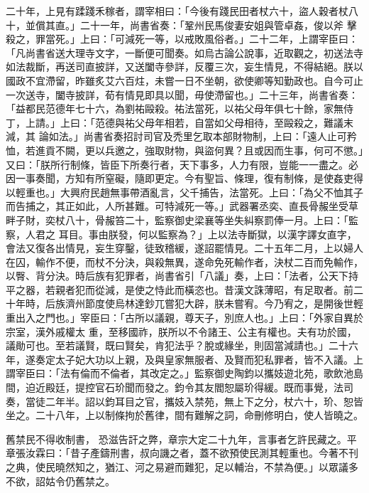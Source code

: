 \begin{pinyinscope}
 二十年，上見有蹂踐禾稼者，謂宰相曰：「今後有踐民田者杖六十，盜人穀者杖八十，並償其直。」二十一年，尚書省奏：「鞏州民馬俊妻安姐與管卓姦，俊以斧
 擊殺之，罪當死。」上曰：「可減死一等，以戒敗風俗者。」二十二年，上謂宰臣曰：「凡尚書省送大理寺文字，一斷便可聞奏。如烏古論公說事，近取觀之，初送法寺如法裁斷，再送司直披詳，又送闔寺參詳，反覆三次，妄生情見，不得結絕。朕以國政不宜滯留，昨雖炙艾六百炷，未嘗一日不坐朝，欲使卿等知勤政也。自今可止一次送寺，闔寺披詳，荀有情見即具以聞，毋使滯留也。」二十三年，尚書省奏：「益都民范德年七十六，為劉祐毆殺。祐法當死，以祐父母年俱七十餘，家無侍丁，上請。」上曰：「范德與祐父母年相若，自當如父母相待，至毆殺之，難議末減，其
 論如法。」尚書省奏招討司官及禿里乞取本部財物制，上曰：「遠人止可矜恤，若進貢不闕，更以兵邀之，強取財物，與盜何異？且或因而生事，何可不懲。」又曰：「朕所行制條，皆臣下所奏行者，天下事多，人力有限，豈能一一盡之。必因一事奏聞，方知有所窒礙，隨即更定。今有聖旨、條理，復有制條，是使姦吏得以輕重也。」大興府民趙無事帶酒亂言，父千捕告，法當死。上曰：「為父不恤其子而告捕之，其正如此，人所甚難。可特減死一等。」武器署丞奕、直長骨赧坐受草畔子財，奕杖八十，骨赧笞二十，監察御史梁襄等坐失糾察罰俸一月。上曰：「監察，人君之
 耳目。事由朕發，何以監察為？」上以法寺斷獄，以漢字譯女直字，會法又復各出情見，妄生穿鑿，徒致稽緩，遂詔罷情見。二十五年二月，上以婦人在囚，輸作不便，而杖不分決，與殺無異，遂命免死輸作者，決杖二百而免輸作，以臀、背分決。時后族有犯罪者，尚書省引「八議」奏，上曰：「法者，公天下持平之器，若親者犯而從減，是使之恃此而橫恣也。昔漢文誅薄昭，有足取者。前二十年時，后族濟州節度使烏林達鈔兀嘗犯大辟，朕未嘗宥。今乃宥之，是開後世輕重出入之門也。」宰臣曰：「古所以議親，尊天子，別庶人也。」上曰：「外家自異於宗室，漢外戚權太
 重，至移國祚，朕所以不令諸王、公主有權也。夫有功於國，議勛可也。至若議賢，既曰賢矣，肯犯法乎？脫或緣坐，則固當減請也。」二十六年，遂奏定太子妃大功以上親，及與皇家無服者、及賢而犯私罪者，皆不入議。上謂宰臣曰：「法有倫而不倫者，其改定之。」監察御史陶鈞以攜妓遊北苑，歌飲池島間，迫近殿廷，提控官石玠聞而發之。鈞令其友閻恕屬玠得緩。既而事覺，法司奏，當徒二年半。詔以鈞耳目之官，攜妓入禁苑，無上下之分，杖六十，玠、恕皆坐之。二十八年，上以制條拘於舊律，間有難解之詞，命刪修明白，使人皆曉之。



 舊禁民不得收制書，
 恐滋告訐之弊，章宗大定二十九年，言事者乞許民藏之。平章張汝霖曰：「昔子產鑄刑書，叔向譏之者，蓋不欲預使民測其輕重也。今著不刊之典，使民曉然知之，猶江、河之易避而難犯，足以輔治，不禁為便。」以眾議多不欲，詔姑令仍舊禁之。




\end{pinyinscope}
